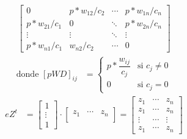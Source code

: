 \documentclass{article}
\begin{document}
	\begin{align*}
		\begin{bmatrix}
			0 & p*w_{12}/c_{2} & \cdots &p*w_{1n}/c_{n}\\
			p*w_{21}/c_{1}& 0 & \ddots &  p*w_{2n}/c_{n} \\
			\vdots & \vdots &\ddots &\vdots \\
			p*w_{n1}/c_{1} & w_{n2}/c_{2} & \cdots & 0
		\end{bmatrix}	
	\end{align*}
	\begin{align*}
		\text{donde }  [pWD]_{ij} &= \begin{cases}
			p*\dfrac{w_{ij}}{c_{j}} & \text{si } c_{j} \neq 0 \\
			0 & \text{si } c_{j} = 0
		\end{cases}
	\end{align*}
	\begin{align*}
		eZ^t &=  \begin{bmatrix}
			1\\
			\vdots \\
			1
		\end{bmatrix} \cdot \begin{bmatrix}
			z_{1}  & \cdots & z_{n}\\
		\end{bmatrix} =  
		\begin{bmatrix}
			z_{1} & \cdots &z_{n}\\
			z_{1} & \cdots &  z_{n} \\
			\vdots &\cdots &\vdots \\
			z_{1} & \cdots & z_{n} 
		\end{bmatrix}
	\end{align*}	
	
\end{document}
